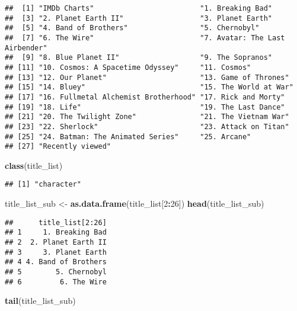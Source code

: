 \documentclass[
]{article}
\newenvironment{Shaded}{\begin{snugshade}}{\end{snugshade}}
\newcommand{\DecValTok}[1]{\textcolor[rgb]{0.00,0.00,0.81}{#1}}
\newcommand{\FunctionTok}[1]{\textcolor[rgb]{0.13,0.29,0.53}{\textbf{#1}}}
\newcommand{\NormalTok}[1]{#1}
\newcommand{\OtherTok}[1]{\textcolor[rgb]{0.56,0.35,0.01}{#1}}
\newcommand{\SpecialCharTok}[1]{\textcolor[rgb]{0.81,0.36,0.00}{\textbf{#1}}}
\begin{document}
\begin{verbatim}
##  [1] "IMDb Charts"                         "1. Breaking Bad"                    
##  [3] "2. Planet Earth II"                  "3. Planet Earth"                    
##  [5] "4. Band of Brothers"                 "5. Chernobyl"                       
##  [7] "6. The Wire"                         "7. Avatar: The Last Airbender"      
##  [9] "8. Blue Planet II"                   "9. The Sopranos"                    
## [11] "10. Cosmos: A Spacetime Odyssey"     "11. Cosmos"                         
## [13] "12. Our Planet"                      "13. Game of Thrones"                
## [15] "14. Bluey"                           "15. The World at War"               
## [17] "16. Fullmetal Alchemist Brotherhood" "17. Rick and Morty"                 
## [19] "18. Life"                            "19. The Last Dance"                 
## [21] "20. The Twilight Zone"               "21. The Vietnam War"                
## [23] "22. Sherlock"                        "23. Attack on Titan"                
## [25] "24. Batman: The Animated Series"     "25. Arcane"                         
## [27] "Recently viewed"
\end{verbatim}

\begin{Shaded}
\begin{Highlighting}[]
\FunctionTok{class}\NormalTok{(title\_list)}
\end{Highlighting}
\end{Shaded}

\begin{verbatim}
## [1] "character"
\end{verbatim}

\begin{Shaded}
\begin{Highlighting}[]
\NormalTok{title\_list\_sub }\OtherTok{\textless{}{-}} \FunctionTok{as.data.frame}\NormalTok{(title\_list[}\DecValTok{2}\SpecialCharTok{:}\DecValTok{26}\NormalTok{])}
\FunctionTok{head}\NormalTok{(title\_list\_sub)}
\end{Highlighting}
\end{Shaded}

\begin{verbatim}
##      title_list[2:26]
## 1     1. Breaking Bad
## 2  2. Planet Earth II
## 3     3. Planet Earth
## 4 4. Band of Brothers
## 5        5. Chernobyl
## 6         6. The Wire
\end{verbatim}

\begin{Shaded}
\begin{Highlighting}[]
\FunctionTok{tail}\NormalTok{(title\_list\_sub)}
\end{Highlighting}
\end{Shaded}
\end{document}
